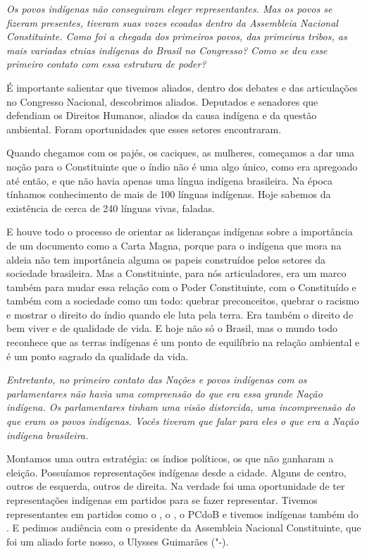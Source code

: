\medskip

\noindent\emph{Os povos indígenas não conseguiram eleger representantes. Mas os
povos se fizeram presentes, tiveram suas vozes ecoadas dentro da
Assembleia Nacional Constituinte. Como foi a chegada dos primeiros
povos, das primeiras tribos, as mais variadas etnias indígenas do Brasil
no Congresso? Como se deu esse primeiro contato com essa estrutura de
poder?}

É importante salientar que tivemos aliados, dentro dos
debates e das articulações no Congresso Nacional, descobrimos aliados.
Deputados e senadores que defendiam os Direitos Humanos, aliados da
causa indígena e da questão ambiental. Foram oportunidades que esses
setores encontraram.

Quando chegamos com os pajés, os caciques, as mulheres, começamos a dar
uma noção para o Constituinte que o índio não é uma algo único, como era
apregoado até então, e que não havia apenas uma língua indígena
brasileira. Na época tínhamos conhecimento de mais de 100 línguas
indígenas. Hoje sabemos da existência de cerca de 240 línguas vivas,
faladas.

E houve todo o processo de orientar as lideranças indígenas sobre a
importância de um documento como a Carta Magna, porque para o indígena
que mora na aldeia não tem importância alguma os papeis construídos
pelos setores da sociedade brasileira. Mas a Constituinte, para nós
articuladores, era um marco também para mudar essa relação com o Poder
Constituinte, com o Constituído e também com a sociedade como um todo:
quebrar preconceitos, quebrar o racismo e mostrar o direito do índio
quando ele luta pela terra. Era também o direito de bem viver e de
qualidade de vida. E hoje não só o Brasil, mas o mundo todo reconhece
que as terras indígenas é um ponto de equilíbrio na relação ambiental e
é um ponto sagrado da qualidade da vida.

\medskip

\noindent\emph{Entretanto, no primeiro contato das Nações e povos indígenas com
os parlamentares não havia uma compreensão do que era essa grande Nação
indígena. Os parlamentares tinham uma visão distorcida, uma
incompreensão do que eram os povos indígenas. Vocês tiveram que falar
para eles o que era a Nação indígena brasileira.}

Montamos uma outra estratégia: os índios políticos, os
que não ganharam a eleição. Possuíamos representações indígenas desde a
cidade. Alguns de centro, outros de esquerda, outros de direita. Na
verdade foi uma oportunidade de ter representações indígenas em partidos
para se fazer representar. Tivemos representantes em partidos como o ,
o , o PCdoB e tivemos indígenas também do . E pedimos audiência
com o presidente da Assembleia Nacional Constituinte, que foi um aliado
forte nosso, o Ulysses Guimarães ("-).

